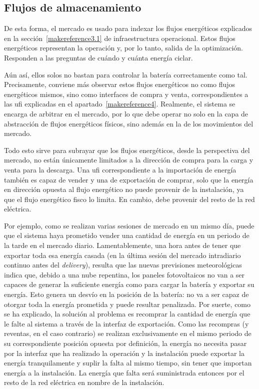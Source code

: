 \subsection{Flujos de almacenamiento}%
\label{makereference5.1.2}

De esta forma, el mercado es usado para indexar los flujos energéticos explicados en la sección~\ref{makereference3.1} de infraestructura operacional. Estos flujos energéticos representan la operación y, por lo tanto, salida de la optimización. Responden a las preguntas de cuándo y cuánta energía ciclar.

Aún así, ellos solos no bastan para controlar la batería correctamente como tal. Precisamente, conviene más observar estos flujos energéticos no como flujos energéticos mismos, sino como interfaces de compra y venta, correspondientes a las \gls{ufi} explicadas en el apartado~\ref{makereference4}. Realmente, el sistema se encarga de arbitrar en el mercado, por lo que debe operar no solo en la capa de abstracción de flujos energéticos físicos, sino además en la de los movimientos del mercado.

Todo esto sirve para subrayar que los flujos energéticos, desde la perspectiva del mercado, no están únicamente limitados a la dirección de compra para la carga y venta para la descarga. Una \gls{ufi} correspondiente a la importación de energía también es capaz de vender y una de exportación de comprar, solo que la energía en dirección opuesta al flujo energético no puede provenir de la instalación, ya que el flujo energético fisco lo limita. En cambio, debe provenir del resto de la red eléctrica.

Por ejemplo, como se realizan varias sesiones de mercado en un mismo día, puede que el sistema haya prometido vender una cantidad de energía en un periodo de la tarde en el mercado diario. Lamentablemente, una hora antes de tener que exportar toda esa energía casada (en la última sesión del mercado intradiario continuo antes del \textit{delivery}), resulta que las nuevas previsiones meteorológicas indica que, debido a una nube repentina, los paneles fotovoltaicos no van a ser capaces de generar la suficiente energía como para cargar la batería y exportar su energía. Esto genera un desvío en la posición de la batería: no va a ser capaz de otorgar toda la energía prometida y puede resultar penalizada. Por suerte, como se ha explicado, la solución al problema es recomprar la cantidad de energía que le falte al sistema a través de la interfaz de exportación. Como las recompras (y reventas, en el caso contrario) se realizan exclusivamente en el mismo periodo de su correspondiente posición opuesta por definición, la energía no necesita pasar por la interfaz que ha realizado la operación y la instalación puede exportar la energía tranquilamente y suplir la falta al mismo tiempo, sin tener que importan energía a la instalación. La energía que falta será suministrada entonces por el resto de la red eléctrica en nombre de la instalación.

